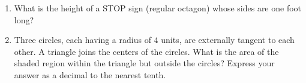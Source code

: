 \documentclass{article}
\begin{document}
\begin{multicols}{2}
\begin{enumerate}
\begin{center}
            \end{center}
            \vspace{3cm}
        \item What is the height of a STOP sign (regular octagon) whose sides are one foot long?
            \vspace{3cm}
        \item Three circles, each having a radius of $4$ units, are externally tangent to each other.
            A triangle joins the centers of the circles.
            What is the area of the shaded region within the triangle but outside the circles?
            Express your answer as a decimal to the nearest tenth.
            \begin{center}
            \end{center}
            \vspace{3cm}
    \end{enumerate}
\end{multicols}
\end{document}
